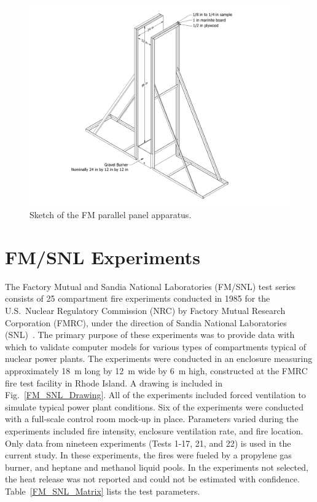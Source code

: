 \begin{figure}[!ht]
\includegraphics[width=\textwidth]{FIGURES/FM_Parallel_Panel/Full_Assembly}
\caption[Sketch of the FM parallel panel apparatus]{Sketch of the FM parallel panel apparatus.}
\label{Parallel_Panel_Sketch}
\end{figure}



\section{FM/SNL Experiments}
\label{FM_SNL_Description}


The Factory Mutual and Sandia National Laboratories (FM/SNL) test series consists of 25 compartment fire experiments conducted in 1985 for the U.S.~Nuclear Regulatory Commission (NRC) by Factory Mutual Research Corporation (FMRC), under the direction of Sandia National Laboratories (SNL)~\cite{Nowlen:NUREG4681,Nowlen:NUREG4527}. The primary purpose of these experiments was to provide data with which to validate computer models for various types of compartments typical of nuclear power plants. The experiments were conducted in an enclosure measuring approximately 18~m long by 12~m wide by 6~m high, constructed at the FMRC fire test facility in Rhode Island. A drawing is included in Fig.~\ref{FM_SNL_Drawing}. All of the experiments included forced ventilation to simulate typical power plant conditions. Six of the experiments were conducted with a full-scale control room mock-up in place. Parameters varied during the experiments included fire intensity, enclosure ventilation rate, and fire location. Only data from nineteen experiments (Tests 1-17, 21, and 22) is used in the current study. In these experiments, the fires were fueled by a propylene gas burner, and heptane and methanol liquid pools. In the experiments not selected, the heat release was not reported and could not be estimated with confidence. Table~\ref{FM_SNL_Matrix} lists the test parameters.

